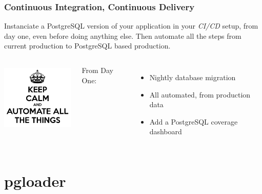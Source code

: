 \documentclass{beamer}
\begin{document}
\begin{frame}[fragile]
  \frametitle{Continuous Integration, Continuous Delivery}

  Instanciate a PostgreSQL version of your application in your
  \textit{CI/CD} setup, from day one, even before doing anything else. Then
  automate all the steps from current production to PostgreSQL based
  production.

  \vfill
  
  \begin{columns}[c]
    \begin{center}
      \includegraphics[height=9em]{keep-calm-and-automate-all-the-things-13.png}
    \end{center}

    From Day One:
    \begin{itemize}
    \item Nightly database migration
    \item All automated, from production data
    \item Add a PostgreSQL coverage dashboard
    \end{itemize}
  \end{columns}
\end{frame}

\section{pgloader}

{
  \begin{frame}[plain]
  \end{frame}
}
\end{document}
